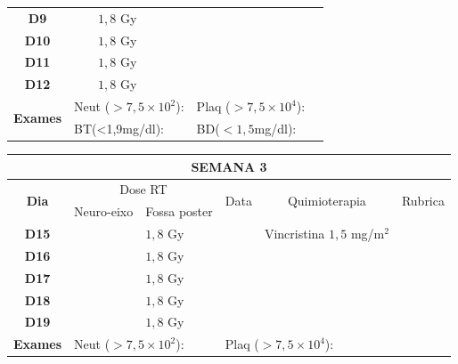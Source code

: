 \documentclass[11pt,a4paper,oldfontcommands]{memoir}
\begin{document}
\begin{center}
\begin{table}[H]
\begin{tabular}{p{1cm}p{2cm}|p{2cm}|p{1cm}|p{4cm}|p{3cm}}
    \multicolumn{1}{c|}{\multirow{1}{*}{\textbf{D9}}}&\multicolumn{1}{c|}{}&{\(1,8\) Gy}&&{}&\\
    \multicolumn{1}{c|}{\multirow{1}{*}{\textbf{D10}}}&\multicolumn{1}{c|}{}&{\(1,8\) Gy}&&{}&\\
    \multicolumn{1}{c|}{\multirow{1}{*}{\textbf{D11}}}&\multicolumn{1}{c|}{}&{\(1,8\) Gy}&&{}&\\
    \multicolumn{1}{c|}{\multirow{1}{*}{\textbf{D12}}}&\multicolumn{1}{c|}{}&{\(1,8\) Gy}&&{}&\\
    \hline
    \multicolumn{1}{c|}{\multirow{2}{*}{\textbf{Exames}}}&\multicolumn{2}{l|}{Neut (\(>7,5\times10^2\)):}&\multicolumn{2}{l|}{Plaq (\(>7,5\times10^4\)):}&\\
    \cline{2-6}
    \multicolumn{1}{c|}{\multirow{2}{*}{{}}}&\multicolumn{2}{l|}{BT(<1,9mg/dl):}&\multicolumn{2}{l|}{BD(\(<1,5\)mg/dl):}&
    \\
    \hline
\end{tabular}
\end{table}
\begin{table}[H]
\begin{tabular}{p{1cm}p{2cm}|p{2cm}|p{1cm}|p{4cm}|p{3cm}}
	\hline
	\multicolumn{6}{c}{\textbf{SEMANA 3}}\\
\hline
    \multicolumn{1}{c|}{\multirow{2}{*}{\textbf{Dia}}}&\multicolumn{2}{c|}{Dose RT}&\multicolumn{1}{c|}{\multirow{2}{*}{Data}}&\multicolumn{1}{c|}{\multirow{2}{*}{Quimioterapia}}&\multicolumn{1}{c}{\multirow{2}{*}{Rubrica}} \\
    \cline{2-3}
    \multicolumn{1}{c|}{\multirow{1}{*}{}}&{Neuro-eixo}&{Fossa poster}&& \\
	\hline
	\multicolumn{1}{c|}{\multirow{1}{*}{\textbf{D15}}}&\multicolumn{1}{c|}{}&{\(1,8\) Gy}&&{Vincristina \(1,5\) mg/m\(^2\)}&\\
    \multicolumn{1}{c|}{\multirow{1}{*}{\textbf{D16}}}&\multicolumn{1}{c|}{}&{\(1,8\) Gy}&&{}&\\    \multicolumn{1}{c|}{\multirow{1}{*}{\textbf{D17}}}&\multicolumn{1}{c|}{}&{\(1,8\) Gy}&&{}&\\
    \multicolumn{1}{c|}{\multirow{1}{*}{\textbf{D18}}}&\multicolumn{1}{c|}{}&{\(1,8\) Gy}&&{}&\\
    \multicolumn{1}{c|}{\multirow{1}{*}{\textbf{D19}}}&\multicolumn{1}{c|}{}&{\(1,8\) Gy}&&{}&\\
    \hline
    \multicolumn{1}{c|}{\multirow{2}{*}{\textbf{Exames}}}&\multicolumn{2}{l|}{Neut (\(>7,5\times10^2\)):}&\multicolumn{2}{l|}{Plaq (\(>7,5\times10^4\)):}&\\

\end{tabular}
\end{table}
\end{center}
\end{document}
